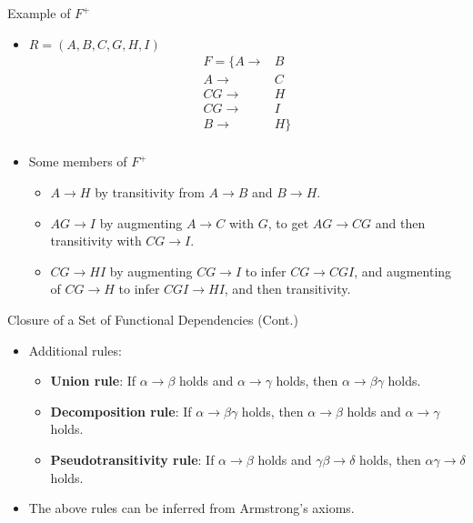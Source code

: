 \documentclass[aspectratio=169]{beamer}
\begin{document}
\begin{frame}{Example of $F^+$}
    \begin{itemize}
        \item $R = (A, B, C, G, H, I)$
            \begin{equation*}
                \begin{align*}
                    F=\{A \rightarrow& B \\
                        A \rightarrow& C \\
                       CG \rightarrow& H \\
                       CG \rightarrow& I \\
                        B \rightarrow& H\} \\
                \end{align*}
            \end{equation*}
        \item Some members of $F^+$
            \begin{itemize}
                \item $A \rightarrow H$ \pause
                by transitivity from $A \rightarrow B$ and $B \rightarrow H$.
                \item $AG \rightarrow I$ \pause
                by augmenting $A \rightarrow C$ with $G$, to get $AG \rightarrow CG$ and then transitivity with $CG \rightarrow I$.
                \item $CG \rightarrow HI$ \pause
                by augmenting $CG \rightarrow I$ to infer $CG \rightarrow CGI$, and augmenting of $CG \rightarrow H$ to infer $CGI \rightarrow HI$, and then transitivity.
            \end{itemize}
    \end{itemize}
\end{frame}

\begin{frame}{Closure of a Set of Functional Dependencies (Cont.)}
    \begin{itemize}
        \item Additional rules:
            \begin{itemize}
                \item \textbf{Union rule}: If $\alpha \rightarrow \beta$ holds and $\alpha \rightarrow \gamma$ holds, then $\alpha \rightarrow \beta \gamma$ holds.
                \item \textbf{Decomposition rule}: If $\alpha \rightarrow \beta \gamma$ holds, then $\alpha \rightarrow \beta$ holds and $\alpha \rightarrow \gamma$ holds.
                \item \textbf{Pseudotransitivity rule}: If $\alpha \rightarrow \beta$ holds and $\gamma \beta \rightarrow \delta$ holds, then $\alpha \gamma \rightarrow \delta$ holds.
            \end{itemize}
        \item The above rules can be inferred from Armstrong's axioms.
    \end{itemize}
\end{frame}
\end{document}
